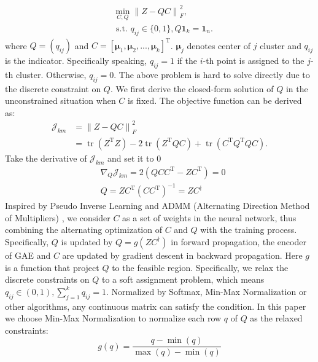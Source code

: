 \documentclass[letterpaper]{article} %
\begin{document}
\begin{equation}
\begin{aligned}
&\min _{C, Q}\left\|Z-Q C\right\|_F^2, \\
&\text { s.t. } q_{i j} \in\{0,1\},Q\mathbf{1}_k=\mathbf{1}_n.
\end{aligned}
\end{equation}
where $Q=(q_{ij})$ and $C=[\boldsymbol{\mu}_1,\boldsymbol{\mu}_2,...,\boldsymbol{\mu}_k]^\mathrm{T}$. $\boldsymbol{\mu}_j$ denotes center of $j$ cluster and $q_{ij}$ is the indicator. Specifically speaking, $q_{ij} = 1$ if the $i$-th point is assigned to the $j$-th cluster. Otherwise, $q_{ij} = 0$. The above problem is hard to solve directly due to the discrete constraint on $Q$. We first derive the closed-form solution of $Q$ in the unconstrained situation when $C$ is fixed. The objective function can be derived as: 
\begin{equation}
    \begin{aligned}
    \mathcal{J}_{km} & =\left\|Z-Q C\right\|_F^2 \\
    & =\operatorname{tr}\left(Z^\mathrm{T} Z\right)-2 \operatorname{tr}\left(Z^\mathrm{T} Q C\right)+\operatorname{tr}\left(C^\mathrm{T} Q^\mathrm{T} Q C\right) .
    \end{aligned}
\end{equation}
Take the derivative of $\mathcal{J}_{km}$ and set it to 0
\begin{equation}
    \begin{aligned}
        &\nabla_Q \mathcal{J}_{km} = 2(QCC^\mathrm{T} - ZC^\mathrm{T})=0 \\
        &Q = ZC^\mathrm{T}(CC^\mathrm{T})^{-1}=ZC^{\dagger}
    \end{aligned}
\end{equation}
Inspired by Pseudo Inverse Learning \cite{GUO2004101} and ADMM (Alternating Direction Method of Multipliers) \cite{admmboyd}, we consider $C$ as a set of weights in the neural network, thus combining the alternating optimization of $C$ and $Q$ with the training process. Specifically, $Q$ is updated by $Q=g(ZC^{\dagger})$ in forward propagation, the encoder of GAE and $C$ are updated by gradient descent in backward propagation. Here $g$ is a function that project $Q$ to the feasible region. Specifically, we relax the discrete constraints on $Q$ to a soft assignment problem, which means $ q_{i j} \in(0,1), \sum_{j=1}^k q_{ij}=1$.  Normalized by Softmax, Min-Max Normalization or other algorithms, any continuous matrix can satisfy the condition. In this paper we choose Min-Max Normalization to normalize each row $q$ of $Q$ as the relaxed constraints:
\begin{equation}
g(q)=\frac{q-\min (q)}{\max (q)-\min (q)}
\end{equation}
\end{document}
